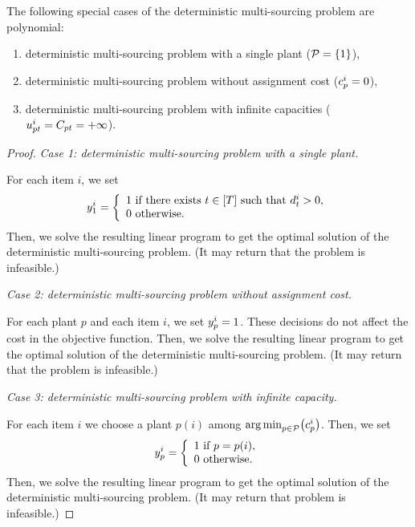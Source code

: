 \begin{prop}\label{prop:deterministic-multi-sourcing:polynomial-cases}
The following special cases of the deterministic multi-sourcing problem are polynomial:
\begin{enumerate}
  \item deterministic multi-sourcing problem with a single plant ($\plants=\crbracket{1}$),
  \item deterministic multi-sourcing problem without assignment cost ($c_p^i=0$),
  \item deterministic multi-sourcing problem with infinite capacities ($u_{pt}^i=C_{pt}=+\infty$).
\end{enumerate}
\end{prop}


\begin{proof}
\emph{Case 1: deterministic multi-sourcing problem with a single plant.}

For each item $i$, we set
$$
\open_1^i=
\left\{
\begin{array}{l}
1\mbox{ if there exists }t\in\range{\horizon}\mbox{ such that }\demand_t^i>0,\\
0\mbox{ otherwise}.
\end{array}
\right.
$$
Then, we solve the resulting linear program to get the optimal solution of the deterministic multi-sourcing problem.
(It may return that the problem is infeasible.)

\medskip

\emph{Case 2: deterministic multi-sourcing problem without assignment cost.}

For each plant $p$ and each item $i$, we set $y_p^i=1$.
These decisions do not affect the cost in the objective function.
Then, we solve the resulting linear program to get the optimal solution of the deterministic multi-sourcing problem.
(It may return that the problem is infeasible.)

\medskip

\emph{Case 3: deterministic multi-sourcing problem with infinite capacity.}

For each item $i$ we choose a plant $p(i)$ among $\argmin_{p\in\plants}\bracket{\affect_p^i}$.
Then, we set
$$
\open_p^i=
\left\{
\begin{array}{l}
1\mbox{ if }p=p(i),\\
0\mbox{ otherwise}.
\end{array}
\right.
$$
Then, we solve the resulting linear program to get the optimal solution of the deterministic multi-sourcing problem.
(It may return that problem is infeasible.)
\end{proof}



